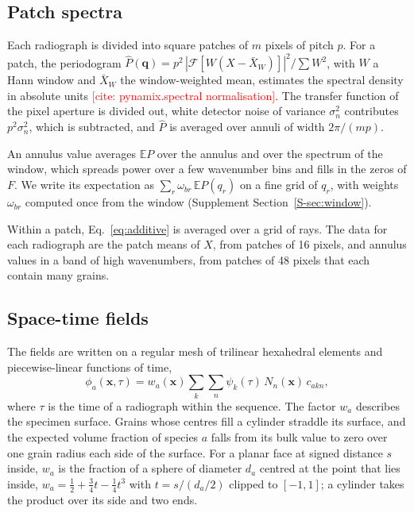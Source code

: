 \documentclass[11pt]{article}
\newcommand{\todo}[1]{\textcolor{red}{[#1]}}
\newcommand{\x}{\bm{x}}
\newcommand{\q}{\bm{q}}
\begin{document}
\subsection{Patch spectra}

Each radiograph is divided into square patches of $m$ pixels of pitch $p$.
For a patch, the periodogram
$\hat P(\q)=p^2\,|\mathcal F[W(X-\bar X_W)]|^2/\sum W^2$, with $W$ a Hann
window and $\bar X_W$ the window-weighted mean, estimates the spectral
density in absolute units \todo{cite: pynamix.spectral normalisation}. The
transfer function of the pixel aperture is divided out, white detector noise
of variance $\sigma_n^2$ contributes $p^2\sigma_n^2$, which is subtracted,
and $\hat P$ is averaged over annuli of width $2\pi/(mp)$.

An annulus value averages $\mathbb{E}P$ over the annulus and over the
spectrum of the window, which spreads power over a few wavenumber bins and
fills in the zeros of $F$. We write its expectation as
$\sum_r\omega_{br}\,\mathbb{E}P(q_r)$ on a fine grid of $q_r$, with weights
$\omega_{br}$ computed once from the window (Supplement
Section~\ref{S-sec:window}).

Within a patch, Eq.~\eqref{eq:additive} is averaged over a grid of rays. The
data for each radiograph are the patch means of $X$, from patches of 16
pixels, and annulus values in a band of high wavenumbers, from patches of 48
pixels that each contain many grains.

\subsection{Space-time fields}

The fields are written on a regular mesh of trilinear hexahedral elements and
piecewise-linear functions of time,
\begin{equation}
\phi_a(\x,\tau)=w_a(\x)\sum_k\sum_n\psi_k(\tau)\,N_n(\x)\,c_{akn},
\label{eq:fields}
\end{equation}
where $\tau$ is the time of a radiograph within the sequence. The factor
$w_a$ describes the specimen surface. Grains whose centres fill a cylinder
straddle its surface, and the expected volume fraction of species $a$ falls
from its bulk value to zero over one grain radius each side of the surface.
For a planar face at signed distance $s$ inside, $w_a$ is the fraction of a
sphere of diameter $d_a$ centred at the point that lies inside,
$w_a=\tfrac12+\tfrac34t-\tfrac14t^3$ with $t=s/(d_a/2)$ clipped to
$[-1,1]$; a cylinder takes the product over its side and two ends.
\end{document}
